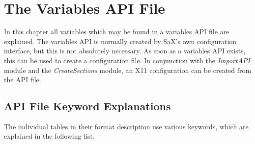 \chapter{The Variables API File}
\label{cha:api}
\minitoc

In this chapter all variables which may be found in a variables 
API file are explained. The variables API is normally created by SaX's own 
configuration interface, but this is not absolutely necessary. As soon as a 
variables API exists, this can be used to create a configuration file. 
In conjunction with the \textit{ImportAPI} module and the
\textit{CreateSections} module, an X11 configuration can be created from the 
API file. 

\section{API File Keyword Explanations}
The individual tables in their format description use various keywords, which
are explained in the following list. 

